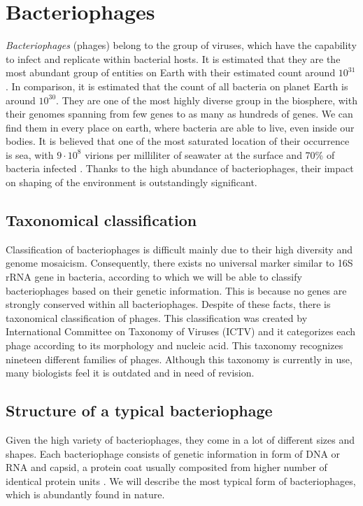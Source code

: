 \section{Bacteriophages}
\emph{Bacteriophages} (phages) belong to the group of viruses, which have the capability to infect and replicate within bacterial hosts.
It is estimated that they are the most abundant group of entities on Earth with their estimated count around $10^{31}$\cite{phage}.
In comparison, it is estimated that the count of all bacteria on planet Earth is around $10^{30}$.
They are one of the most highly diverse group in the biosphere, with their genomes spanning from few genes to as many as hundreds of genes.
We can find them in every place on earth, where bacteria are able to live, even inside our bodies.
It is believed that one of the most saturated location of their occurrence is sea, with  $9\cdot 10^8$ virions per milliliter of seawater at the surface and 70\% of bacteria infected \cite{virioplankton}.
Thanks to the high abundance of bacteriophages, their impact on shaping of the environment is outstandingly significant.

\subsection{Taxonomical classification}
Classification of bacteriophages is difficult mainly due to their high diversity and genome mosaicism. \cite{phagetax}
Consequently, there exists no universal marker similar to 16S rRNA gene in bacteria, according to which we will be able to classify bacteriophages based on their genetic information.
This is because no genes are strongly conserved within all bacteriophages.
Despite of these facts, there is taxonomical classification of phages.
This classification was created by International Committee on Taxonomy of Viruses (ICTV) and it categorizes each phage according to its morphology and nucleic acid.
This taxonomy recognizes nineteen different families of phages.
Although this taxonomy is currently in use, many biologists feel it is outdated and in need of revision. \cite{phagetax}

\subsection{Structure of a typical bacteriophage}
Given the high variety of bacteriophages, they come in a lot of different sizes and shapes.
Each bacteriophage consists of genetic information in form of DNA or RNA and capsid, a protein coat usually composited from higher number of identical protein units \cite{}.
We will describe the most typical form of bacteriophages, which is abundantly found in nature.

